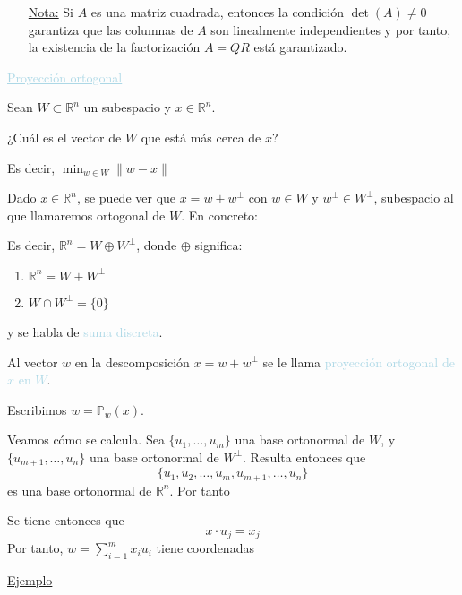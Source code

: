 \documentclass[12pt]{article}
\begin{document}
\begin{itemize}
\item[\underline{Nota:}] Si $A$ es una matriz cuadrada, entonces la condición $\det(A)\neq0$ garantiza que las columnas de $A$ son linealmente independientes y por tanto, la existencia de la factorización $A=QR$ está garantizado.
\end{itemize}
\textcolor{lightblue}{\underline{Proyección ortogonal}}

Sean $W\subset\mathbb{R}^n$ un subespacio y $x\in\mathbb{R}^n$.

\begin{center}
\end{center}
¿Cuál es el vector de $W$ que está más cerca de $x$?

Es decir, $\min_{w\in W}\|w-x\|$

Dado $x\in \mathbb{R}^n$, se puede ver que $x=w+w^\bot$ con $w\in W$ y $w^\bot\in W^\bot$, subespacio al que llamaremos ortogonal de $W$. En concreto: \begin{center}
\end{center}
Es decir, $\mathbb{R}^n=W\oplus W^\bot$, donde $\oplus$ significa:
\begin{enumerate}[label=\roman*)]
\item $\mathbb{R}^n=W+W^\bot$
\item $W\cap W^\bot=\{0\}$
\end{enumerate}
y se habla de \textcolor{lightblue}{suma discreta}.

Al vector $w$ en la descomposición $x=w+w^\bot$ se le llama \textcolor{lightblue}{proyección ortogonal de $x$ en $W$}.

Escribimos $w=\mathbb{P}_w(x)$.

Veamos cómo se calcula. Sea $\{u_1,\hdots,u_m\}$ una base ortonormal de $W$, y $\{u_{m+1},\hdots,u_n\}$ una base ortonormal de $W^\bot$. Resulta entonces que \[\{u_{1},u_{2},\hdots,u_m,u_{m+1},\hdots,u_n\}\] es una base ortonormal de $\mathbb{R}^n$. Por tanto \begin{center}
\end{center}
Se tiene entonces que \[x\cdot u_j=x_j\]
Por tanto, $w=\sum_{i=1}^mx_iu_i$ tiene coordenadas \begin{center}
\end{center}
\underline{Ejemplo}
\end{document}
